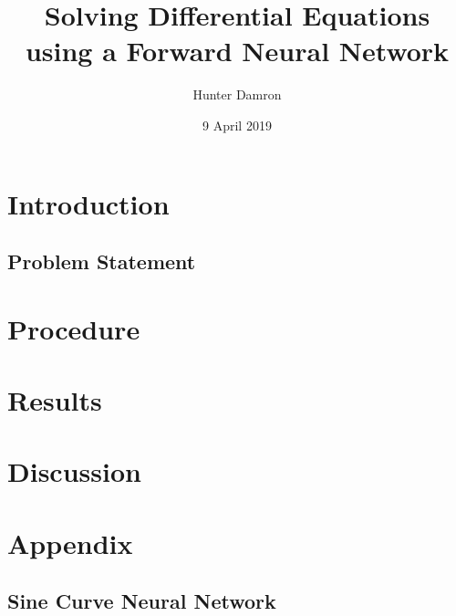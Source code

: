 \documentclass{article}
\title{Solving Differential Equations using a Forward Neural Network}
\author{Hunter Damron}
\date{9 April 2019}
\def\datadir{2019-04-08-01-26-52}
\begin{document}
    \maketitle

    \section{Introduction}
    \subsection{Problem Statement}
    \section{Procedure}
    \section{Results}
    \section{Discussion}


    \begin{figure}[!htbp]
        \centering
    \end{figure}

    \appendix
    \section{Appendix}
    \setcounter{secnumdepth}{2}
    \renewcommand{\thesubsection}{\Alph{subsection}}
    \subsection{Sine Curve Neural Network} \label{apx:code1}
    
\end{document}
